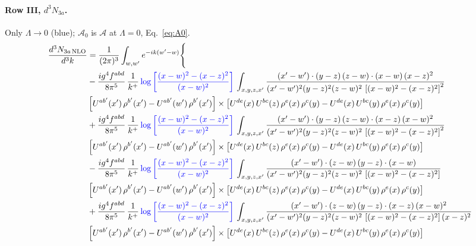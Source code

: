 \documentclass[10pt]{article}
\numberwithin{equation}{section}
\newcommand{\new}[1]{{\color{blue}#1}}
\begin{document}
\paragraph{Row III, $d^3N_{3a}$.}
Only $\Lambda\to0$ (\new{blue}); $\mathcal A_0$ is $\mathcal A$ at $\Lambda=0$, Eq.~\eqref{eq:A0}.
\begin{align}
\frac{d^{3}N_{3a\,\rm NLO}}{d^{3}k} & = \frac{1}{(2\pi)^{3}}\int_{w,w'}e^{-ik(w'-w)}\Bigg\{\notag \\
&  
-\frac{ig^{4}f^{abd}}{8\pi^{5}}\,\frac{1}{k^{+}}\,\new{\log{\left[\frac{(x-w)^{2}-(x-z)^{2}}{(x-w)^{2}}\right]}}\,\int_{x,y,z,x'}
\frac{(x'-w')\cdot(y-z)\,(z-w)\cdot(x-w)\,(x-z)^{2}}{(x'-w')^{2}(y-z)^{2}(z-w)^{2}\,\left[(x-w)^{2}-(x-z)^{2}\right]^{2}}\notag \\ & \left[U^{ab'}(x')\,\rho^{b'}(x')-U^{ab'}(w')\, \rho^{b'}(x')\right]\times \left[U^{de}(x)\,U^{bc}(z)\, \rho^{e}(x)\,\rho^{c}(y)-U^{de}(x)\,U^{bc}(y)\,\rho^{e}(x)\,\rho^{c}(y)\right] \notag \\
& +\frac{ig^{4}f^{abd}}{8\pi^{5}}\,\frac{1}{k^{+}}\,\new{\log{\left[\frac{(x-w)^{2}-(x-z)^{2}}{(x-w)^{2}}\right]}}\,\int_{x,y,z,x'}
\frac{(x'-w')\cdot(y-z)\,(z-w)\cdot(x-z)\,(x-w)^{2}}{(x'-w')^{2}(y-z)^{2}(z-w)^{2}\,\left[(x-w)^{2}-(x-z)^{2}\right]^{2}}\notag \\ 
&\left[U^{ab'}(x')\,\rho^{b'}(x')-U^{ab'}(w')\, \rho^{b'}(x')\right]\times \left[U^{de}(x)\,U^{bc}(z)\, \rho^{e}(x)\,\rho^{c}(y)-U^{de}(x)\,U^{bc}(y)\,\rho^{e}(x)\,\rho^{c}(y)\right] \notag \\
& -\frac{ig^{4}f^{abd}}{8\pi^{5}}\,\frac{1}{k^{+}}\,\new{\log{\left[\frac{(x-w)^{2}-(x-z)^{2}}{(x-w)^{2}}\right]}}\,\int_{x,y,z,x'}
\frac{(x'-w')\cdot(z-w)\,(y-z)\cdot(x-w)}{(x'-w')^{2}(y-z)^{2}(z-w)^{2}\,\left[(x-w)^{2}-(x-z)^{2}\right]}\notag \\ & \left[U^{ab'}(x')\,\rho^{b'}(x')-U^{ab'}(w')\, \rho^{b'}(x')\right]\times \left[U^{de}(x)\,U^{bc}(z)\, \rho^{e}(x)\,\rho^{c}(y)-U^{de}(x)\,U^{bc}(y)\,\rho^{e}(x)\,\rho^{c}(y)\right] \notag \\
&  +\frac{ig^{4}f^{abd}}{8\pi^{5}}\,\frac{1}{k^{+}}\,\new{\log{\left[\frac{(x-w)^{2}-(x-z)^{2}}{(x-w)^{2}}\right]}}\,\int_{x,y,z,x'}
\frac{(x'-w')\cdot(z-w)\,(y-z)\cdot(x-z)\,(x-w)^{2}}{(x'-w')^{2}(y-z)^{2}(z-w)^{2}\,\left[(x-w)^{2}-(x-z)^{2}\right](x-z)^{2}}\notag \\ & \left[U^{ab'}(x')\,\rho^{b'}(x')-U^{ab'}(w')\, \rho^{b'}(x')\right]\times \left[U^{de}(x)\,U^{bc}(z)\, \rho^{e}(x)\,\rho^{c}(y)-U^{de}(x)\,U^{bc}(y)\,\rho^{e}(x)\,\rho^{c}(y)\right] \notag \\

\end{align}
\end{document}

